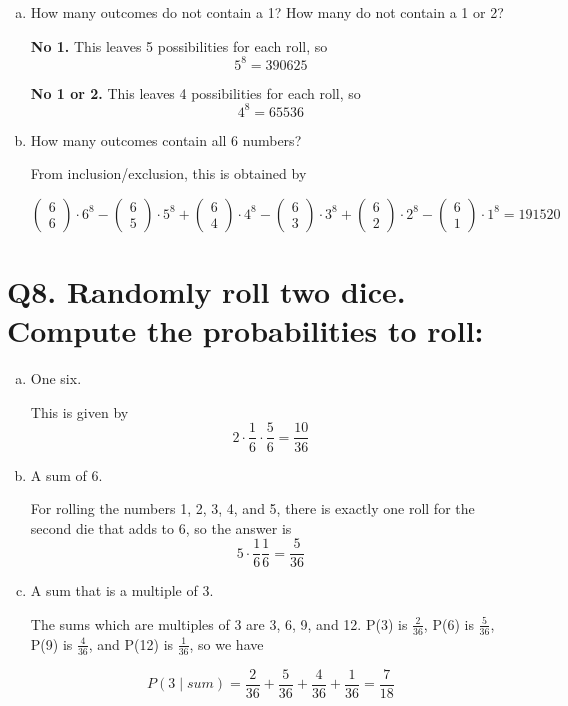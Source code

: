 \documentclass{article}
\begin{document}
\begin{enumerate}[(a)]
  \item How many outcomes do not contain a 1? How many do not contain a 1 or 2?

    \textbf{No 1.} This leaves 5 possibilities for each roll, so $$5^8 = 390625$$

    \textbf{No 1 or 2.} This leaves 4 possibilities for each roll, so $$4^8 = 65536$$
    
  \item How many outcomes contain all 6 numbers?

    From inclusion/exclusion, this is obtained by

    \[
      \begin{pmatrix}
        6 \\ 6
      \end{pmatrix} \cdot 6^8 -
      \begin{pmatrix}
        6 \\ 5
      \end{pmatrix} \cdot 5^8 +
      \begin{pmatrix}
        6 \\ 4
      \end{pmatrix} \cdot 4^8 -
      \begin{pmatrix}
        6 \\ 3
      \end{pmatrix} \cdot 3^8 +
      \begin{pmatrix}
        6 \\ 2
      \end{pmatrix} \cdot 2^8 -
      \begin{pmatrix}
        6 \\ 1
      \end{pmatrix} \cdot 1^8
      = 191520
    \]
\end{enumerate}



\section*{Q8. \normalsize Randomly roll two dice. Compute the probabilities to roll:}

\begin{enumerate}[(a)]
  \item One six.

    This is given by $$2\cdot\frac{1}{6}\cdot \frac{5}{6} = \frac{10}{36}$$
  \item A sum of 6.
    
    For rolling the numbers 1, 2, 3, 4, and 5, there is exactly one roll for the second die that adds to 6, so the answer is $$5\cdot \frac{1}{6}\frac{1}{6} = \frac{5}{36}$$
  \item A sum that is a multiple of 3.

    The sums which are multiples of 3 are 3, 6, 9, and 12. P(3) is $\frac{2}{36}$, P(6) is $\frac{5}{36}$, P(9) is $\frac{4}{36}$, and P(12) is $\frac{1}{36}$, so we have

    $$P(3\mid sum) = \frac{2}{36} + \frac{5}{36} + \frac{4}{36} + \frac{1}{36} = \frac{7}{18}$$
\end{enumerate}
\end{document}

